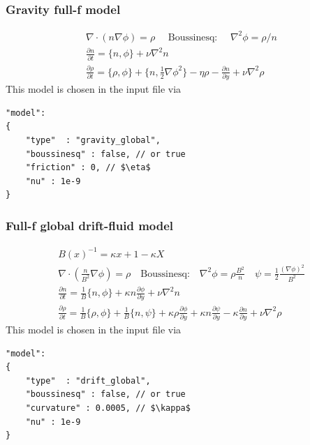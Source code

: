 \subsubsection{Gravity full-f model}
\begin{subequations}
\begin{align}
 \nabla \cdot(n \nabla \phi) = \rho \quad\text{ Boussinesq: }\quad \nabla^2 \phi = \rho/n \\
 \frac{\partial n}{\partial t} = \{ n, \phi\} +  \nu \nabla^2 n  \\
  \frac{\partial \rho}{\partial t} = \{ \rho, \phi\} + \{n, \frac{1}{2} \nabla\phi^2\} - \eta \rho - \frac{\partial n}{\partial y} +\nu\nabla^2\rho
\end{align}
\end{subequations}
This model is chosen in the input file via
\begin{verbatim}
"model":
{
    "type"  : "gravity_global",
    "boussinesq" : false, // or true
    "friction" : 0, // $\eta$
    "nu" : 1e-9
}
\end{verbatim}

\subsubsection{Full-f global drift-fluid model}
\begin{subequations}
\begin{align}
B(x)^{-1} = \kappa x +1-\kappa X\\
 \nabla \cdot \left(\frac{n}{B^2} \nabla \phi\right) = \rho \quad
 \text{Boussinesq:}\quad \nabla^2\phi = \rho \frac{B^2}{n} \quad
\psi = \frac{1}{2} \frac{(\nabla\phi)^2}{B^2}\\
 \frac{\partial n}{\partial t}     =
    \frac{1}{B}\{ n, \phi\}
  + \kappa n\frac{\partial \phi}{\partial y}
  + \nu \nabla^2 n  \\
  \frac{\partial \rho}{\partial t} =
  \frac{1}{B}\{ \rho, \phi\}
  + \frac{1}{B}\{n, \psi\}
  + \kappa \rho\frac{\partial \phi}{\partial y}
  + \kappa n\frac{\partial \psi}{\partial y}
  - \kappa\frac{\partial n}{\partial y} +\nu\nabla^2\rho 
\end{align}
\end{subequations}
This model is chosen in the input file via
\begin{verbatim}
"model":
{
    "type"  : "drift_global",
    "boussinesq" : false, // or true
    "curvature" : 0.0005, // $\kappa$
    "nu" : 1e-9
}
\end{verbatim}
